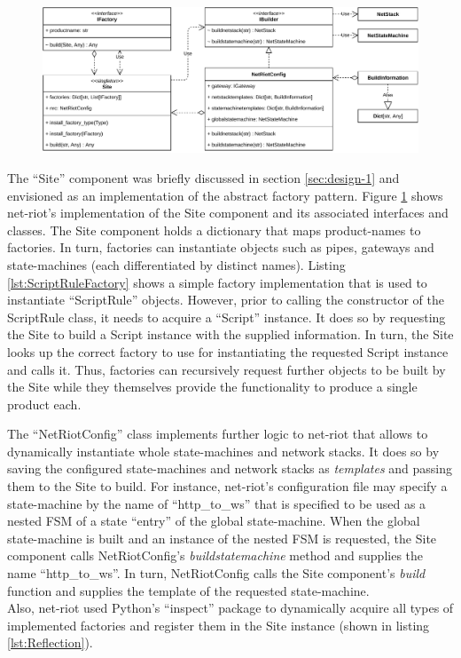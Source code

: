 \begin{figure}[h]
    \centering
    \includegraphics[width=14cm]{img/ch06/net-riot-factory.pdf}
    \label{fig:net-riot-factory}
\end{figure}
The \enquote{Site} component was briefly discussed in section \ref{sec:design-1} and envisioned as an implementation of the abstract factory pattern. Figure \ref{fig:net-riot-factory} shows net-riot's implementation of the Site component and its associated interfaces and classes. The Site component holds a dictionary that maps product-names to factories. In turn, factories can instantiate objects such as pipes, gateways and state-machines (each differentiated by distinct names). Listing \ref{lst:ScriptRuleFactory} shows a simple factory implementation that is used to instantiate \enquote{ScriptRule} objects. However, prior to calling the constructor of the ScriptRule class, it needs to acquire a \enquote{Script} instance. It does so by requesting the Site to build a Script instance with the supplied information. In turn, the Site looks up the correct factory to use for instantiating the requested Script instance and calls it. Thus, factories can recursively request further objects to be built by the Site while they themselves provide the functionality to produce a single product each.

The \enquote{NetRiotConfig} class implements further logic to net-riot that allows to dynamically instantiate whole state-machines and network stacks. It does so by saving the configured state-machines and network stacks as \emph{templates} and passing them to the Site to build. For instance, net-riot's configuration file may specify a state-machine by the name of \enquote{http\_to\_ws} that is specified to be used as a nested \ac{FSM} of a state \enquote{entry} of the global state-machine. When the global state-machine is built and an instance of the nested \ac{FSM} is requested, the Site component calls NetRiotConfig's \emph{buildstatemachine} method and supplies the name \enquote{http\_to\_ws}. In turn, NetRiotConfig calls the Site component's \emph{build} function and supplies the template of the requested state-machine.\\
Also, net-riot used Python's \enquote{inspect} package to dynamically acquire all types of implemented factories and register them in the Site instance (shown in listing \ref{lst:Reflection}).



